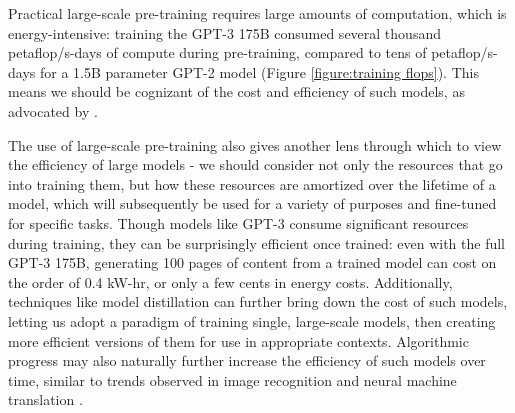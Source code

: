 Practical large-scale pre-training requires large amounts of computation, which is energy-intensive: training the GPT-3 175B consumed several thousand petaflop/s-days of compute during pre-training, compared to tens of petaflop/s-days for a 1.5B parameter GPT-2 model (Figure \ref{figure:training flops}). This means we should be cognizant of the cost and efficiency of such models, as advocated by \cite{schwartz2019}. 
   
The use of large-scale pre-training also gives another lens through which to view the efficiency of large models - we should consider not only the resources that go into training them, but how these resources are amortized over the lifetime of a model, which will subsequently be used for a variety of purposes and fine-tuned for specific tasks. Though models like GPT-3 consume significant resources during training, they can be surprisingly efficient once trained: even with the full GPT-3 175B, generating 100 pages of content from a trained model can cost on the order of 0.4 kW-hr, or only a few cents in energy costs. Additionally, techniques like model distillation \cite{liu2019improving} can further bring down the cost of such models, letting us adopt a paradigm of training single, large-scale models, then creating more efficient versions of them for use in appropriate contexts. Algorithmic progress may also naturally further increase the efficiency of such models over time, similar to trends observed in image recognition and neural machine translation \cite{hernandez2020}.
